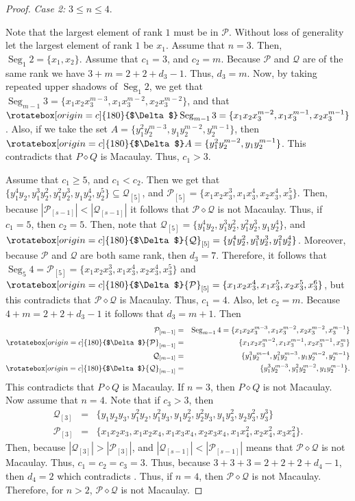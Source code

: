 \documentclass[11pt, reqno]{amsart}
\newcommand{\Q}{{\mathcal Q}}
\renewcommand{\P}{{\mathcal P}}
\newcommand{\uSdw}{\rotatebox[origin=c]{180}{$\Delta$}}
\def\Seg{\operatorname{Seg}}
\theoremstyle{plain} %
\theoremstyle{definition}
\theoremstyle{remark}
\numberwithin{equation}{section}  %
\begin{document}
\begin{proof}
\emph{Case 2:} $3 \leq n\leq 4$.

Note that the largest element of rank $1$ must be in $\P$. Without loss of generality let the largest element of rank $1$ be $x_1$. Assume that $n = 3$. Then, $\Seg_1 2 = \{x_1,x_2\}$. Assume that $c_1 = 3$, and $c_2 = m$. Because $\P$ and $\Q$ are of the same rank we have $3 + m = 2 + 2 + d_3 - 1$. Thus, $d_3 = m$. Now, by taking repeated upper shadows of $\Seg_1 2$, we get that $\Seg_{m-1} 3 = \{x_1x_2x_3^{m-3},x_1x_3^{m-2},x_2x_3^{m-2}\}$, and that $\uSdw \Seg_{m-1} 3 = \{x_1x_2x_3^{m-2},x_1x_3^{m-1},x_2x_3^{m-1}\}$. Also, if we take the set $A = \{y_1^2y_2^{m-3},y_1y_2^{m-2},y_2^{m-1}\}$, then $\uSdw A = \{y_1^2y_2^{m-2},y_1y_2^{m-1}\}$. This contradicts that $P \diamond Q$ is Macaulay. Thus, $c_1 > 3$. 
 
 Assume that $c_1 \geq 5$, and $c_1 < c_2$. Then we get that $\{y_1^4y_2,y_1^3y_2^2,y_1^2y_2^3,y_1y_2^4,y_2^5\} \subseteq \Q_{[5]}$, and  $\P_{[5]} = \{x_1x_2x_3^3,x_1x_3^4,x_2x_3^4,x_3^5\}$. Then, because $|\P_{[s-1]}| < |\Q_{[s-1]}|$ it follows that $\P \diamond \Q$ is not Macaulay. Thus, if $c_1 = 5$, then $c_2 = 5$. Then, note that $\Q_{[5]} = \{y_1^4y_2,y_1^3y_2^2,y_1^2y_2^3,y_1y_2^4\}$, and $\uSdw \Q_{[5]} = \{y_1^4y_2^2,y_1^3y_2^3,y_1^2y_2^4\}$. Moreover, because $\P$ and $\Q$ are both same rank, then $d_3 = 7$. Therefore, it follows that $\Seg_5 4 = \P_{[5]} = \{x_1x_2x_3^3,x_1x_3^4,x_2x_3^4,x_3^5\}$ and $\uSdw \P_{[5]} = \{x_1x_2x_3^4, x_1x_3^5, x_2x_3^5, x_3^6\}$, but this contradicts that $\P \diamond \Q$ is Macaulay. Thus, $c_1 = 4$. Also, let $c_2 = m$. Because $4 + m = 2 + 2 + d_3 - 1$ it follows that $d_3 = m+1$. Then
 \begin{eqnarray*}
 \P_{[m-1]} &=& \Seg_{m-1} 4 = \{x_1x_2x_3^{m-3},x_1x_3^{m-2},x_2x_3^{m-2},x_3^{m-1}\}\\
 \uSdw \P_{[m-1]} &=&\{x_1x_2x_3^{m-2},x_1x_3^{m-1},x_2x_3^{m-1},x_3^m\}\\
  \Q_{[m-1]} &=& \{y_1^3y_2^{m-4},y_1^2y_2^{m-3},y_1y_2^{m-2},y_2^{m-1}\}\\
  \uSdw \Q_{[m-1]} &=&\{y_1^3y_2^{m-3},y_1^2y_2^{m-2},y_1y_2^{m-1}\}.
  \end{eqnarray*}
This contradicts that $P \diamond Q$ is Macaulay. If $n = 3$, then $P \diamond Q$ is not Macaulay. Now assume that $n = 4$. Note that if $c_3 > 3$, then 
\begin{eqnarray*}
\Q_{[3]} &=&  \{y_1y_2y_3,y_1^2y_2,y_1^2y_3,y_1y_2^2,y_2^2y_3,y_1y_3^2,y_2y_3^2,y_3^3\}\\
\P_{[3]} &=&  \{x_1x_2x_3,x_1x_2x_4,x_1x_3x_4,x_2x_3x_4,x_1x_4^2,x_2x_4^2,x_3x_4^2\}.
\end{eqnarray*}
Then, because $|\Q_{[3]}| > |\P_{[3]}|$, and $|\Q_{[s-1]}| < |\P_{[s-1]}|$ means that $\P \diamond \Q$ is not Macaulay. Thus, $c_1 = c_2 = c_3 = 3$. Thus, because $3 + 3 + 3 = 2 + 2 + 2 + d_4 - 1$, then $d_4 = 2$ which contradicts . Thus, if $n = 4$, then $\P \diamond \Q$ is not Macaulay. Therefore, for $n > 2$, $\P \diamond \Q$ is not Macaulay.
\end{proof}
\end{document}
